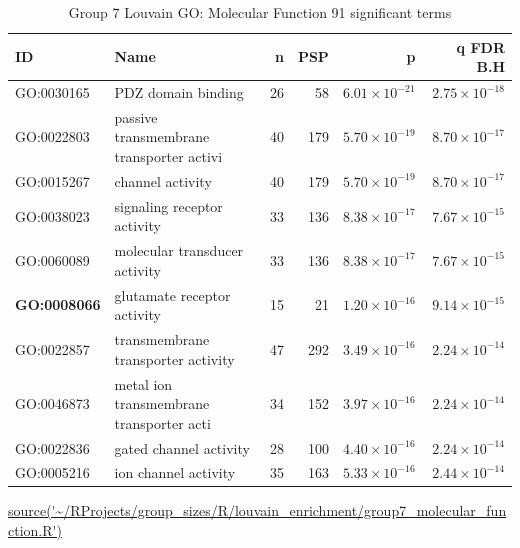 \begin{table}[ht]
\centering
\begin{adjustbox}{width=\textwidth}

\setlength{\extrarowheight}{2pt}
\begin{tabular}{llrrrr}
  \toprule
ID & Name & n & PSP & p & q FDR B.H \\ 
  \midrule
GO:0030165 & PDZ domain binding & 26 & 58 & $6.01 \times 10^{-21}$ & $2.75 \times 10^{-18}$ \\ 
  GO:0022803 & passive transmembrane transporter activi & 40 & 179 & $5.70 \times 10^{-19}$ & $8.70 \times 10^{-17}$ \\ 
  GO:0015267 & channel activity & 40 & 179 & $5.70 \times 10^{-19}$ & $8.70 \times 10^{-17}$ \\ 
  GO:0038023 & signaling receptor activity & 33 & 136 & $8.38 \times 10^{-17}$ & $7.67 \times 10^{-15}$ \\ 
  GO:0060089 & molecular transducer activity & 33 & 136 & $8.38 \times 10^{-17}$ & $7.67 \times 10^{-15}$ \\ 
  \textbf{GO:0008066} & glutamate receptor activity & 15 & 21 & $1.20 \times 10^{-16}$ & $9.14 \times 10^{-15}$ \\ \setlength{\extrarowheight}{2pt}
  GO:0022857 & transmembrane transporter activity & 47 & 292 & $3.49 \times 10^{-16}$ & $2.24 \times 10^{-14}$ \\ 
  GO:0046873 & metal ion transmembrane transporter acti & 34 & 152 & $3.97 \times 10^{-16}$ & $2.24 \times 10^{-14}$ \\ 
  GO:0022836 & gated channel activity & 28 & 100 & $4.40 \times 10^{-16}$ & $2.24 \times 10^{-14}$ \\ 
  GO:0005216 & ion channel activity & 35 & 163 & $5.33 \times 10^{-16}$ & $2.44 \times 10^{-14}$ \\ 
   \bottomrule
\end{tabular}
\end{adjustbox}
\caption{Group 7 Louvain GO: Molecular Function 91 significant terms} 
\tiny\url{source('~/RProjects/group_sizes/R/louvain_enrichment/group7_molecular_function.R')}
\label{tab:Group 7 GO: Molecular Function 91 significant terms}
\end{table}


